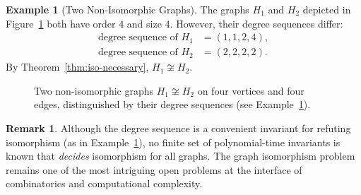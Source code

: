 \documentclass[12pt,a4paper]{article}
\theoremstyle{definition}
\newtheorem{example}{Example}[section]
\newtheorem{remark}{Remark}[section]
\theoremstyle{plain}
\begin{document}
\begin{example}[Two Non-Isomorphic Graphs]\label{ex:noniso}
  The graphs \(H_1\) and \(H_2\) depicted in Figure~\ref{fig:nonisomorphic}
  both have order \(4\) and size \(4\).  However, their degree sequences
  differ:
  \begin{align}
    \text{degree sequence of } H_1 &= (1,1,2,4), \label{eq:degseq-H1}\\
    \text{degree sequence of } H_2 &= (2,2,2,2). \label{eq:degseq-H2}
  \end{align}
  By Theorem~\ref{thm:iso-necessary}, \(H_1 \not\cong H_2\).
\end{example}

\begin{figure}[htbp]
  \centering
  \caption{Two non-isomorphic graphs \(H_1 \not\cong H_2\) on four vertices
           and four edges, distinguished by their degree sequences
           (see Example~\ref{ex:noniso}).}
  \label{fig:nonisomorphic}
\end{figure}

\begin{remark}\label{rem:iso-hardness}
  Although the degree sequence is a convenient invariant for refuting
  isomorphism (as in Example~\ref{ex:noniso}), no finite set of polynomial-time
  invariants is known that \emph{decides} isomorphism for all graphs.  The
  graph isomorphism problem remains one of the most intriguing open problems
  at the interface of combinatorics and computational complexity.
\end{remark}
\end{document}
